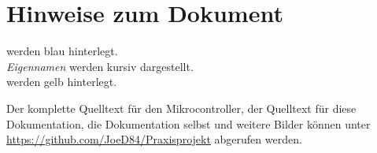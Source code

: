 \documentclass[
]{report}
\begin{document}

%
%


%		

\listoffigures						%
\listoftables						%
\renewcommand{\lstlistlistingname}{Codeverzeichnis}
\lstlistoflistings					%
\chapter{Hinweise zum Dokument}
\thechapter

 werden blau hinterlegt.\\

\emph{Eigennamen} werden kursiv dargestellt.\\

 werden gelb hinterlegt.\\

\lstset{language=C, basicstyle=\footnotesize, showstringspaces=false, tabsize=8}

Der komplette Quelltext für den Mikrocontroller, der Quelltext für diese Dokumentation, die Dokumentation selbst und weitere Bilder können unter \url{https://github.com/JoeD84/Praxisprojekt} abgerufen werden.
\clearpage
{}
\end{document}
